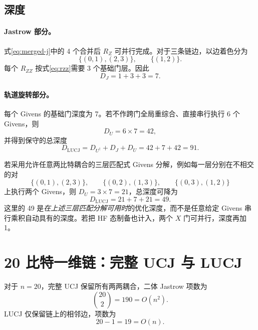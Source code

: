 \documentclass[11pt,a4paper]{ctexart}
\begin{document}
\subsection{深度}

\paragraph{Jastrow 部分。}
式\eqref{eq:merged-j}中的 4 个合并后 $R_Z$ 可并行完成。对于三条链边，以边着色分为
\begin{equation}
    \{(0,1),(2,3)\},\qquad \{(1,2)\}.
\end{equation}
每个 $R_{ZZ}$ 按式\eqref{eq:rzz}需要 3 个基础门层。因此
\begin{equation}
    D_J=1+3+3=7.
    \label{eq:jdepth}
\end{equation}

\paragraph{轨道旋转部分。}
每个 Givens 的基础门深度为 7。若不作跨门全局重综合、直接串行执行 6 个 Givens，则
\begin{equation}
    D_U=6\times7=42,
\end{equation}
并得到保守的总深度
\begin{equation}
    D_{\mathrm{LUCJ}}=D_{U^\dagger}+D_J+D_U=42+7+42=91.
    \label{eq:depth-conservative}
\end{equation}

若采用允许任意两比特耦合的三层匹配式 Givens 分解，例如每一层分别在不相交的对
\begin{equation}
    \{(0,1),(2,3)\},\qquad
    \{(0,2),(1,3)\},\qquad
    \{(0,3),(1,2)\}
\end{equation}
上执行两个 Givens，则 $D_U=3\times7=21$，总深度可降为
\begin{equation}
    \boxed{D_{\mathrm{LUCJ}}=21+7+21=49.}
    \label{eq:depth-optimized}
\end{equation}
这里的 49 是\emph{在上述三层匹配分解可用时}的优化深度，而不是任意给定 Givens 串行乘积自动具有的深度。若把 HF 态制备也计入，两个 $X$ 门可并行，深度再加 1。

\section{20 比特一维链：完整 UCJ 与 LUCJ}

对于 $n=20$，完整 UCJ 保留所有两两耦合，二体 Jastrow 项数为
\begin{equation}
    \binom{20}{2}=190=O(n^2).
\end{equation}
LUCJ 仅保留链上的相邻边，项数为
\begin{equation}
    20-1=19=O(n).
\end{equation}
\end{document}
